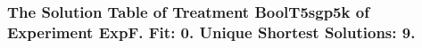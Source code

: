 \begin{frame}
 \fontsize{8pt}{9pt}\selectfont
 \frametitle{ The Solution Table of Treatment BoolT5sgp5k of Experiment ExpF. Fit: 0. Unique Shortest Solutions: 9. }

 \label{ExpFSolutionTable006.tex}  
 \end{frame}

